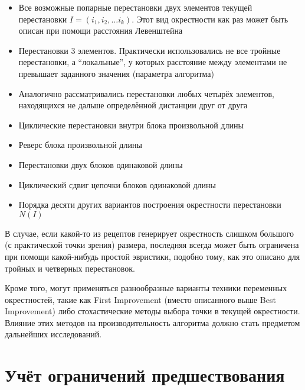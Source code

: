 \documentclass{article}
\begin{document}
\begin{itemize}
    \item Все возможные попарные перестановки двух элементов текущей перестановки $I=(i_1, i_2, \dots i_k)$.
    Этот вид окрестности как раз может быть описан при помощи расстояния Левенштейна
    \item Перестановки 3 элементов.
    Практически использовались не все тройные перестановки,
    а ``локальные'',
    у которых расстояние между элементами не превышает
    заданного значения
    (параметра алгоритма)
    \item Аналогично рассматривались перестановки любых
    четырёх элементов,
    находящихся не дальше определённой дистанции
    друг от друга
    \item Циклические перестановки внутри блока произвольной длины
    \item Реверс блока произвольной длины
    \item Перестановки двух блоков одинаковой длины
    \item Циклический сдвиг цепочки блоков одинаковой длины
    \item Порядка десяти других вариантов построения окрестности перестановки $N(I)$
\end{itemize}

В случае,
если какой-то из рецептов генерирует
окрестность слишком большого 
(с практической точки зрения)
размера,
последняя всегда может быть
ограничена при помощи какой-нибудь простой эвристики,
подобно тому,
как это описано для 
тройных и четверных перестановок.

Кроме того,
могут применяться разнообразные варианты
техники переменных окрестностей,
такие как
First Improvement
(вместо описанного выше Best Improvement)
либо стохастические методы выбора
точки в текущей окрестности.
Влияние этих методов
на производительность алгоритма
должно стать предметом дальнейших исследований.

\section{Учёт ограничений предшествования}
\end{document}
